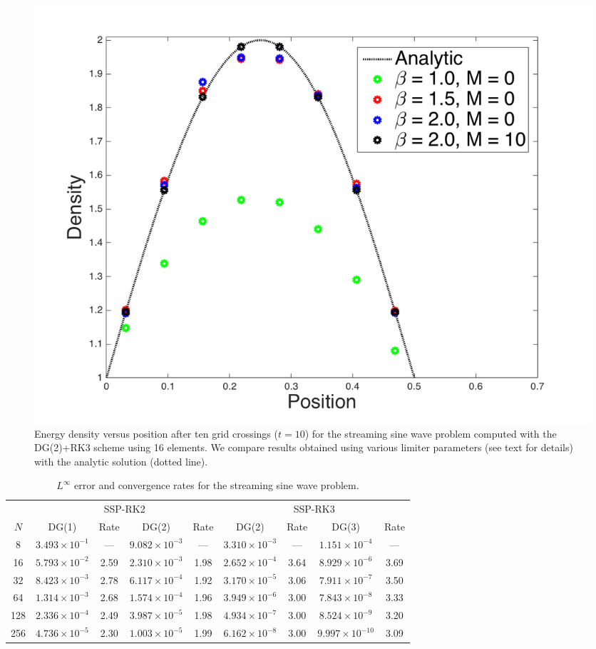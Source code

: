 \documentclass[10pt,preprint]{aastex}
\begin{document}
\begin{figure}
  \begin{center}
    \includegraphics[scale=0.38]{./Figures/StreamingSineWave1D}
  \end{center}
  \caption{Energy density versus position after ten grid crossings ($t=10$) for the streaming sine wave problem computed with the DG(2)+RK3 scheme using 16 elements.  We compare results obtained using various limiter parameters (see text for details) with the analytic solution (dotted line).}
  \label{fig:streamingSineWave}
\end{figure}

\begin{table}
  \begin{center}
  \caption{$L^{\infty}$ error and convergence rates for the streaming sine wave problem.}
  \label{tab:streamingSineWave}
  \begin{tabular}{ccccccccc}
    & \multicolumn{4}{c}{SSP-RK2} & \multicolumn{4}{c}{SSP-RK3} \\
    \cmidrule(r){2-5} \cmidrule(r){6-9}
    $N$ & DG(1) & Rate & DG(2) & Rate & DG(2) & Rate & DG(3) & Rate \\
    \midrule \midrule
    8     & $3.493\times10^{-1}$ & ---  & $9.082\times10^{-3}$ & ---  & $3.310\times10^{-3}$ & ---  & $1.151\times10^{-4}$  & --- \\
    16   & $5.793\times10^{-2}$ &2.59& $2.310\times10^{-3}$ &1.98& $2.652\times10^{-4}$ &3.64& $8.929\times10^{-6}$ &3.69 \\
    32   & $8.423\times10^{-3}$ &2.78& $6.117\times10^{-4}$ &1.92& $3.170\times10^{-5}$ &3.06& $7.911\times10^{-7}$ &3.50 \\
    64   & $1.314\times10^{-3}$ &2.68& $1.574\times10^{-4}$ &1.96& $3.949\times10^{-6}$ &3.00& $7.843\times10^{-8}$ &3.33 \\
    128 & $2.336\times10^{-4}$ &2.49& $3.987\times10^{-5}$ &1.98& $4.934\times10^{-7}$ &3.00& $8.524\times10^{-9}$ &3.20 \\
    256 & $4.736\times10^{-5}$ &2.30& $1.003\times10^{-5}$ &1.99& $6.162\times10^{-8}$ &3.00& $9.997\times10^{-10}$ &3.09 \\
    \midrule \midrule
  \end{tabular}
  \end{center}
\end{table}
\end{document}
